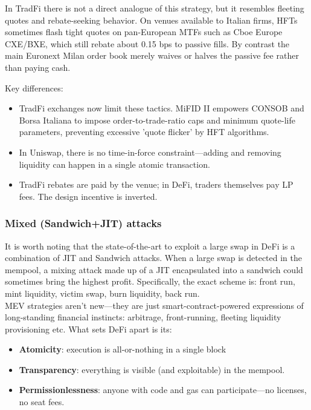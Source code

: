 \documentclass[a4paper,11pt]{article}
\begin{document}
In TradFi there is not a direct analogue of this strategy, but it resembles fleeting quotes and rebate-seeking behavior. On venues available to Italian firms, HFTs sometimes flash tight quotes on pan-European MTFs such as Cboe Europe CXE/BXE, which still rebate about 0.15 bps to passive fills. By contrast the main Euronext Milan order book merely waives or halves the passive fee rather than paying cash.

Key differences:
\begin{itemize}
    \item TradFi exchanges now limit these tactics. MiFID II empowers CONSOB and Borsa Italiana to impose order-to-trade-ratio caps and minimum quote-life parameters, preventing excessive 'quote flicker' by HFT algorithms.
    \item In Uniswap, there is no time-in-force constraint—adding and removing liquidity can happen in a single atomic transaction.
    \item TradFi rebates are paid by the venue; in DeFi, traders themselves pay LP fees. The design incentive is inverted.
\end{itemize}



\subsubsection{Mixed (Sandwich+JIT) attacks}
It is worth noting that the state-of-the-art to exploit a large swap in DeFi is a combination of JIT and Sandwich attacks. When a large swap is detected in the mempool, a mixing attack made up of a JIT encapsulated into a sandwich could sometimes bring the highest profit. Specifically, the exact scheme is: front run, mint liquidity, victim swap, burn liquidity, back run.\\


\noindent MEV strategies aren’t new—they are just smart-contract-powered expressions of long-standing financial instincts: arbitrage, front-running, fleeting liquidity provisioning etc. What sets DeFi apart is its:
\begin{itemize}
    \item \textbf{Atomicity}: execution is all-or-nothing in a single block
    \item \textbf{Transparency}: everything is visible (and exploitable) in the mempool.
    \item \textbf{Permissionlessness}: anyone with code and gas can participate—no licenses, no seat fees.
\end{itemize}
\end{document}
